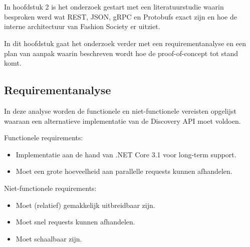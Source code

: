
\chapter{}
\label{ch:methodologie}


In hoofdstuk 2 is het onderzoek gestart met een literatuurstudie waarin besproken werd wat REST, JSON, gRPC en Protobufs exact zijn en hoe de interne architectuur van Fashion Society er uitziet.

In dit hoofdstuk gaat het onderzoek verder met een requirementanalyse en een plan van aanpak waarin beschreven wordt hoe de proof-of-concept tot stand komt.



\section{Requirementanalyse}
\label{sec:Requirementanalyse}

In deze analyse worden de functionele en niet-functionele vereisten opgelijst waaraan een alternatieve implementatie van de Discovery API moet voldoen.

Functionele requirements:
\begin{itemize}
    \item Implementatie aan de hand van .NET Core 3.1 voor long-term support.
    \item Moet een grote hoeveelheid aan parallelle requests kunnen afhandelen.

\end{itemize}

Niet-functionele requirements:
\begin{itemize}
    \item Moet (relatief) gemakkelijk uitbreidbaar zijn.
 \item Moet snel requests kunnen afhandelen.
     \item Moet schaalbaar zijn.
\end{itemize}



